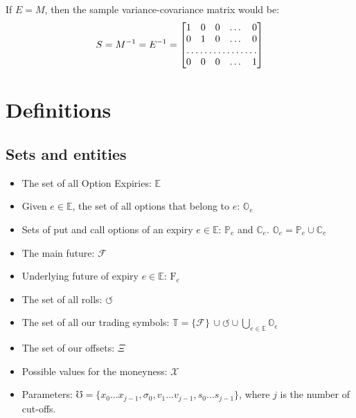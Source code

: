 \documentclass[10pt, a4paper, oneside]{article}
\newcommand{\expiries}{\ensuremath{\mathbb{E}}}
\newcommand{\options}{\ensuremath{\mathbb{O}}}
\newcommand{\puts}{\ensuremath{\mathbb{P}}}
\newcommand{\calls}{\ensuremath{\mathbb{C}}}
\newcommand{\mfuture}{\ensuremath{\mathcal{F}}}
\newcommand{\future}{\ensuremath{\mathrm{F}}}
\newcommand{\rolls}{\ensuremath{\circlearrowleft}}
\newcommand{\total}{\ensuremath{\mathbb{T}}}
\newcommand{\offsets}{\ensuremath{\Xi}}
\newcommand{\moneynessset}{\ensuremath{\mathcal{X}}}
\newcommand{\params}{\ensuremath{\mho}}
\newcommand{\volatility}{\ensuremath{\sigma}}
\begin{document}
If $E = M$, then the sample variance-covariance matrix would be:
\[
S = M^{-1} = E^{-1} = 
\begin{bmatrix}
    1 & 0 & 0 & \dots & 0 \\
    0 & 1 & 0 & \dots & 0 \\
    \hdotsfor{5} \\
    0 & 0 & 0 & \dots & 1
\end{bmatrix}
\]

\iffalse

\chapter{Definitions}

\section{Sets and entities}
\begin{itemize}
  \item The set of all Option Expiries: $\expiries$
  \item Given $e \in \expiries$, the set of all options that belong to $e$: $\options_e$
  \item Sets of put and call options of an expiry $e\in\expiries$: $\puts_e$ and $\calls_e$. $\options_e = \puts_e\!\cup\calls_e$
  \item The main future: $\mfuture$
  \item Underlying future of expiry $e \in \expiries$: $\future_e$
  \item The set of all rolls: $\rolls$
  \item The set of all our trading symbols: $\total = \{\mfuture\}\,\cup\rolls\cup\bigcup_{e \in \expiries}\options_e$
  \item The set of our offsets: $\offsets$
  \item Possible values for the moneyness: $\moneynessset$
  \item Parameters: $\params = \{x_0\dots x_{j-1}, \volatility_0, v_1\dots v_{j-1}, s_0\dots s_{j-1}\}$, where $j$ is the number of cut-offs.
\end{itemize}
\end{document}
